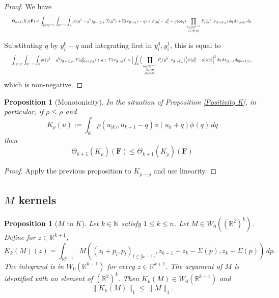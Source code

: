 \documentclass[12pt,reqno]{amsart}
\theoremstyle{plain}
\newtheorem{proposition}[theorem]{Proposition}
\numberwithin{equation}{section}
\theoremstyle{remark}
\newcommand{\using}[1]{}
\newcommand{\R}{{\mathbb R}}
\newcommand{\N}{{\mathbb N}}
\newcommand{\F}{\mathbf{F}}
\begin{document}
\begin{proof}
We have
\[
\resizebox{0.98\textwidth}{!}{$\displaystyle \Theta_{k+1}(K)(\F) = \int_{(\R^2)^{k+1}}\int_{\R^{n-k}}\int_\R \rho((y^1-y^0)_{[k+1)\setminus i},\Sigma(y^0)+\Sigma(x_{[k,n)})-q) \times \phi(y_i^1-y_i^0+q)\phi(q) \prod_{\substack{h\in [2)^{k+1}\\j\in[k,n)}} F_j(y^h,x_{[k,n)\setminus j}) \,dq\,dx_{[k,n)}\,dy .$}
\]

Substituting \(q\) by \(y_i^0-q\) and integrating first in \(y_i^0,y_i^1\), this is equal to
\[
\resizebox{0.98\textwidth}{!}{$\displaystyle \int_{(\R^2)^{k}}\int_{\R^{n-k}}\int_\R \rho((y^1-y^0)_{[k+1)\setminus i}, \Sigma(y^0_{[k+1)\setminus i})+q+\Sigma(x_{[k,n)})) \times \Big| \int_\R \Big( \prod_{\substack{h\in [2)^{k+1}\\ h_i=0\\ j\in[k,n)}} F_j(y^h,x_{[k,n)\setminus j}) \Big) \phi(y_i^0-q)\,dy_i^0 \Big|^2 \,dq\,dx_{[k,n)}\,dy_{[k+1)\setminus i},$}
\]
which is non-negative.
\end{proof}


\begin{proposition}[Monotonicity]\label{Monotonicity K}In the situation of Proposition \ref{Positivity K},
in particular, if $\rho\le \tilde{\rho}$ and
\begin{equation}\label{auto:kernel-monotonicity-K-rho} K_\rho(u):=\int_\R \rho(u_{[k)}, u_{k+1}-q) \phi(u_{k}+q) \phi(q) \, dq\end{equation}
then
\begin{equation}\label{auto:kernel-monotonicity-bound} \Theta_{k+1}(K_\rho)(\F) \le \Theta_{k+1}(K_{\tilde{\rho}})(\F) \end{equation}
\end{proposition}
\begin{proof}
    Apply the previous proposition to $K_{\tilde{\rho}-\rho}$ and use linearity.
\end{proof}

\subsection{\texorpdfstring{$M$}{M} kernels}

\begin{proposition}[$M$ to $K$]\label{M to K}\using{W_0 Brascamp Lieb}
Let $k\in\N$ satisfy $1\le k\le n$. Let $M\in W_0((\R^2)^k)$.
Define for $z\in \R^{k+1}$,
\begin{equation}\label{kviam_2}
    K_k(M)(z)=\int_{\R^{k-1}}  M((z_{l}+p_{l},p_{l})_{l\in [k-1)}, z_{k-1}+z_{k}-\Sigma(p),z_{k}-\Sigma(p))\,dp.
\end{equation}
The integrand is in $W_0(\R^{k-1})$ for every $z\in\R^{k+1}$.
The argument of $M$ is identified with an element of $(\R^2)^{k}$.
Then $K_k(M)\in W_0(\R^{k+1})$ and
\begin{equation}\label{auto:K-map-L1-bound} \|K_k(M)\|_1 \le \|M\|_1. \end{equation}
\end{proposition}
\end{document}
